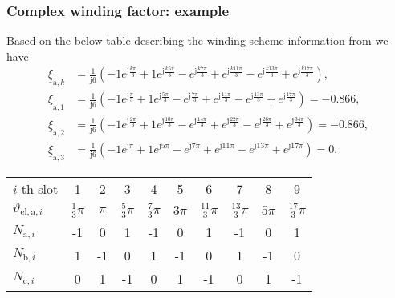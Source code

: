 \begin{frame}
	\frametitle{Complex winding factor: example}
    Based on the below table describing the winding scheme information from  we have
    \begin{align*}
        \underline{\xi}_{\mathrm{a},k} &= \frac{1}{\mathrm{j}6}\left(-1e^{\mathrm{j}\frac{k\pi}{3}} + 1 e^{\mathrm{j}\frac{k5\pi}{3}}-e^{\mathrm{j}\frac{k7\pi}{3}} + e^{\mathrm{j}\frac{k11\pi}{3}} - e^{\mathrm{j}\frac{k13\pi}{3}}+e^{\mathrm{j}\frac{k17\pi}{3}}\right),\\
        \underline{\xi}_{\mathrm{a},1} &= \frac{1}{\mathrm{j}6}\left(-1e^{\mathrm{j}\frac{\pi}{3}} + 1 e^{\mathrm{j}\frac{5\pi}{3}}-e^{\mathrm{j}\frac{7\pi}{3}} + e^{\mathrm{j}\frac{11\pi}{3}} - e^{\mathrm{j}\frac{13\pi}{3}}+e^{\mathrm{j}\frac{17\pi}{3}}\right) = -0.866,\\
        \underline{\xi}_{\mathrm{a},2} &= \frac{1}{\mathrm{j}6}\left(-1e^{\mathrm{j}\frac{2\pi}{3}} + 1 e^{\mathrm{j}\frac{10\pi}{3}}-e^{\mathrm{j}\frac{14\pi}{3}} + e^{\mathrm{j}\frac{22\pi}{3}} - e^{\mathrm{j}\frac{26\pi}{3}}+e^{\mathrm{j}\frac{34\pi}{3}}\right) = -0.866,\\
        \underline{\xi}_{\mathrm{a},3} &= \frac{1}{\mathrm{j}6}\left(-1e^{\mathrm{j}\pi} + 1 e^{\mathrm{j}5\pi}-e^{\mathrm{j}7\pi} + e^{\mathrm{j}11\pi} - e^{\mathrm{j}13\pi}+e^{\mathrm{j}17\pi}\right) = 0.
    \end{align*}
    \vspace{-0.35cm}
    \begin{table}
        \centering
        \begin{tabular}{l c c c c c c c c c}
            \toprule
           $i$-th slot & 1 & 2 & 3 & 4 & 5 & 6 & 7 & 8 & 9 \\ 
           $\vartheta_{\mathrm{el},\mathrm{a},i}$ & $\frac{1}{3}\pi$ & $\pi$ & $\frac{5}{3}\pi$ & $\frac{7}{3}\pi$ & $3\pi$ & $\frac{11}{3}\pi$ & $\frac{13}{3}\pi$ & $5\pi$ & $\frac{17}{3}\pi$\\ 
           \midrule
              $N_{\mathrm{a},i}$ & -1 & 0 & 1 & -1 & 0 & 1 & -1 & 0 & 1\\
              $N_{\mathrm{b},i}$ & 1 & -1 & 0 & 1 & -1 & 0 & 1 & -1 & 0\\
                $N_{\mathrm{c},i}$ & 0 & 1 & -1 & 0 & 1 & -1 & 0 & 1 & -1\\
            \bottomrule
        \end{tabular}
    \end{table}
\end{frame} 